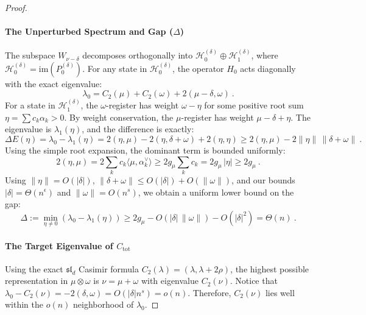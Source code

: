 \documentclass[11pt,letterpaper]{article}
\begin{document}
\begin{proof}
\paragraph{The Unperturbed Spectrum and Gap ($\Delta$) }
The subspace $W_{\nu-\delta}$ decomposes orthogonally into $\mathcal{H}_0^{(\delta)} \oplus \mathcal{H}_1^{(\delta)}$, where $\mathcal{H}_0^{(\delta)} = \mathrm{im}(P_0^{(\delta)})$.
For any state in $\mathcal{H}_0^{(\delta)}$, the operator $H_0$ acts diagonally with the exact eigenvalue:
\begin{equation}
    \lambda_0 = C_2(\mu) + C_2(\omega) + 2 (\mu - \delta, \omega) \ .
\end{equation}
For a state in $\mathcal{H}_1^{(\delta)}$, the $\omega$-register has weight $\omega - \eta$ for some positive root sum $\eta = \sum c_k \alpha_k > 0$. By weight conservation, the $\mu$-register has weight $\mu - \delta + \eta$. The eigenvalue is $\lambda_1(\eta)$, and the difference is exactly:
\begin{equation}
    \Delta E(\eta) = \lambda_0 - \lambda_1(\eta) = 2 (\eta, \mu) - 2 (\eta, \delta + \omega) + 2 (\eta, \eta) \ge 2 (\eta, \mu) - 2 \|\eta\| \, \|\delta + \omega\| \ .
\end{equation}
Using the simple root expansion, the dominant term is bounded uniformly:
\begin{equation}
    2(\eta, \mu) = 2 \sum_k c_k \langle \mu, \alpha_k^\vee \rangle \ge 2 g_\mu \sum_k c_k = 2 g_\mu \, |\eta| \ge 2 g_\mu \ .
\end{equation}
Using $\|\eta\| = O(|\delta|)$, $\|\delta + \omega\| \le O(|\delta|) + O(\|\omega\|)$, and our bounds $|\delta| =\Theta(n^\epsilon)$ and $\|\omega\| = O(n^s)$, we obtain a uniform lower bound on the gap:
\begin{equation}
    \Delta := \min_{\eta \neq 0} (\lambda_0 - \lambda_1(\eta)) \ge 2 g_\mu - O(|\delta| \, \|\omega\|) - O(|\delta|^2) = \Theta(n) \ .
\end{equation}

\paragraph{The Target Eigenvalue of $C_{\mathrm{tot}}$}
Using the exact $\mathfrak{sl}_d$ Casimir formula $C_2(\lambda) = (\lambda, \lambda + 2\rho)$, the highest possible representation in $\mu \otimes \omega$ is $\nu = \mu + \omega$ with eigenvalue $C_2(\nu)$.
Notice that $\lambda_0 - C_2(\nu) = -2(\delta, \omega) = O(|\delta| n^s) = o(n)$. Therefore, $C_2(\nu)$ lies well within the $o(n)$ neighborhood of $\lambda_0$.


\end{proof}
\end{document}
